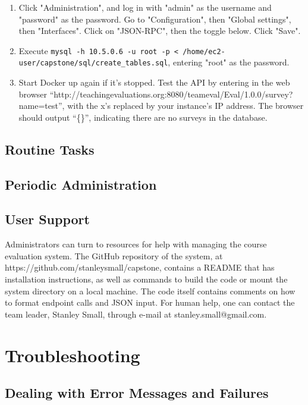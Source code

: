 \documentclass{article}
\begin{document}
\begin{enumerate}
    \item Click "Administration", and log in with "admin" as the username and "password" as the password. Go to "Configuration", then "Global settings", then "Interfaces". Click on "JSON-RPC", then the toggle below. Click "Save".

    \item Execute \verb|mysql -h 10.5.0.6 -u root -p < /home/ec2-user/capstone/sql/create_tables.sql|, entering "root" as the password.

    \item Start Docker up again if it's stopped. Test the API by entering in the web browser ``http://\newline teachingevaluations.org:8080/teameval/Eval/1.0.0/survey?name=test'', with the x’s replaced by your instance’s IP address. The browser should output ``\{\}'', indicating there are no surveys in the database.
\end{enumerate}

\subsection{Routine Tasks}



\subsection{Periodic Administration}



\subsection{User Support}

Administrators can turn to resources for help with managing the course evaluation system. The GitHub repository of the system, at https://github.com/stanleysmall/capstone, contains a README that has installation instructions, as well as commands to build the code or mount the system directory on a local machine. The code itself contains comments on how to format endpoint calls and JSON input. For human help, one can contact the team leader, Stanley Small, through e-mail at stanley.small@gmail.com.

\section{Troubleshooting}

\subsection{Dealing with Error Messages and Failures}
\end{document}
